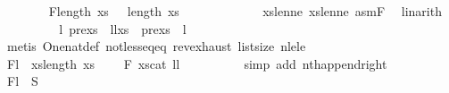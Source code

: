 \begin{isabellebody}
\ \ \ \ \ \ \isamarkupfalse%
\ F{}{\isacharcolon}{\kern0pt}{\isachardoublequoteopen}length\ xs{}\ {\isasymge}\ {}{\isachardoublequoteclose}\ {\isachardoublequoteopen}length\ xs{}\ {\isasymge}\ {}{\isachardoublequoteclose}\ \isanewline
\ \ \ \ \ \ \ \ \isamarkupfalse%
\ xs{}{\isacharunderscore}{\kern0pt}len{\isacharunderscore}{\kern0pt}ne{\isacharunderscore}{\kern0pt}{}\ xs{}{\isacharunderscore}{\kern0pt}len{\isacharunderscore}{\kern0pt}ne{\isacharunderscore}{\kern0pt}{}\ asmF{\isacharparenleft}{\kern0pt}{}{\isacharparenright}{\kern0pt}\ \isamarkupfalse%
\ linarith{\isacharplus}{\kern0pt}\isanewline
\isanewline
\ \ \ \ \ \ \isamarkupfalse%
\ \isamarkupfalse%
\ l{}\ prexs{}\ \ l{}l{}{\isacharcolon}{\kern0pt}{\isachardoublequoteopen}xs{}\ {\isacharequal}{\kern0pt}\ prexs{}\ {\isacharat}{\kern0pt}\ {\isacharbrackleft}{\kern0pt}l{}{\isacharbrackright}{\kern0pt}{\isachardoublequoteclose}\isanewline
\ \ \ \ \ \ \ \ \isamarkupfalse%
\ {\isacharparenleft}{\kern0pt}metis\ One{\isacharunderscore}{\kern0pt}nat{\isacharunderscore}{\kern0pt}def\ not{\isacharunderscore}{\kern0pt}less{\isacharunderscore}{\kern0pt}eq{\isacharunderscore}{\kern0pt}eq\ rev{\isacharunderscore}{\kern0pt}exhaust\ list{\isachardot}{\kern0pt}size{\isacharparenleft}{\kern0pt}{}{\isacharparenright}{\kern0pt}\ nle{\isacharunderscore}{\kern0pt}le{\isacharparenright}{\kern0pt}\isanewline
\isanewline
\ \ \ \ \ \ \isamarkupfalse%
\ F{}{\isacharcolon}{\kern0pt}{\isachardoublequoteopen}l{}\ {\isacharequal}{\kern0pt}\ xs{\isacharbang}{\kern0pt}{\isacharparenleft}{\kern0pt}length\ xs{}\ {\isacharminus}{\kern0pt}\ {}{\isacharparenright}{\kern0pt}{\isachardoublequoteclose}\ \isamarkupfalse%
\ F{}{\isacharparenleft}{\kern0pt}{}{\isacharparenright}{\kern0pt}\ xs{\isacharunderscore}{\kern0pt}cat\ l{}l{}\isanewline
\ \ \ \ \ \ \ \ \isamarkupfalse%
\ {\isacharparenleft}{\kern0pt}simp\ add{\isacharcolon}{\kern0pt}\ nth{\isacharunderscore}{\kern0pt}append{\isacharunderscore}{\kern0pt}right{\isacharparenright}{\kern0pt}\isanewline
\ \ \ \ \ \ \isamarkupfalse%
\ F{}{\isacharcolon}{\kern0pt}{\isachardoublequoteopen}l{}\ {\isasymin}\ S{}{\isachardoublequoteclose}\ \isamarkupfalse%

\end{isabellebody}
